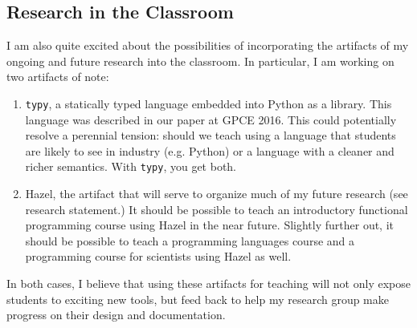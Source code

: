 \documentclass[9pt]{extarticle}
\begin{document}
\subsection*{Research in the Classroom}
I am also quite excited about the possibilities of incorporating the artifacts of my ongoing and future research into the classroom. In particular, I am working on two artifacts of note:
\begin{enumerate}
	\item \texttt{typy}, a statically typed language embedded into Python as a library. This language was described in our paper at GPCE 2016. This could potentially resolve a perennial tension: should we teach using a language that students are likely to see in industry (e.g. Python) or a language with a cleaner and richer semantics. With \texttt{typy}, you get both.
	\item Hazel, the artifact that will serve to organize much of my future research (see research statement.) It should be possible to teach an introductory functional programming course using Hazel in the near future. Slightly further out, it should be possible to teach a programming languages course and a programming course for scientists using Hazel as well.
\end{enumerate}
In both cases, I believe that using these artifacts for teaching will not only expose students to exciting new tools, but feed back to help my research group make progress on their design and documentation.
\end{document}
